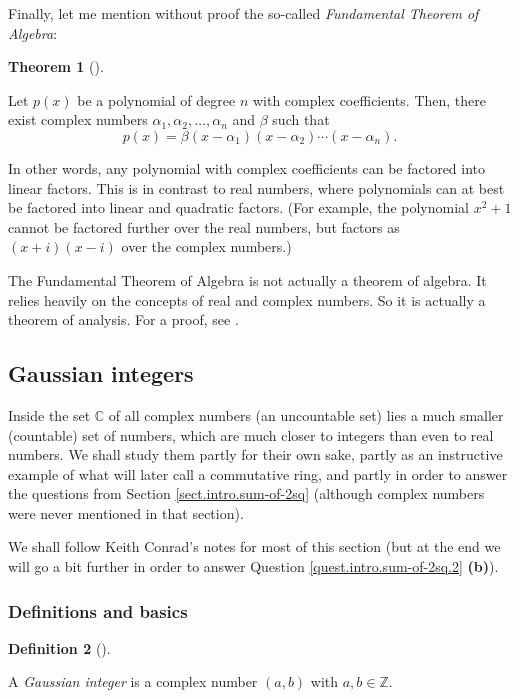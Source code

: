 \documentclass[numbers=enddot,12pt,final,onecolumn,notitlepage]{scrartcl}%
\numberwithin{exer}{subsection}
\theoremstyle{definition}
\newtheorem{theo}{Theorem}[subsection]
\newenvironment{theorem}[1][]
{\begin{theo}[#1]\begin{leftbar}}
{\end{leftbar}\end{theo}}
\newtheorem{defi}[theo]{Definition}
\newenvironment{definition}[1][]
{\begin{defi}[#1]\begin{leftbar}}
{\end{leftbar}\end{defi}}
\begin{document}
Finally, let me mention without proof the so-called \textit{Fundamental
Theorem of Algebra}:

\begin{theorem}
\label{thm.CC.FTA.factor}Let $p\left(  x\right)  $ be a polynomial of degree
$n$ with complex coefficients. Then, there exist complex numbers $\alpha
_{1},\alpha_{2},\ldots,\alpha_{n}$ and $\beta$ such that%
\[
p\left(  x\right)  =\beta\left(  x-\alpha_{1}\right)  \left(  x-\alpha
_{2}\right)  \cdots\left(  x-\alpha_{n}\right)  .
\]

\end{theorem}

In other words, any polynomial with complex coefficients can be factored into
linear factors. This is in contrast to real numbers, where polynomials can at
best be factored into linear and quadratic factors. (For example, the
polynomial $x^{2}+1$ cannot be factored further over the real numbers, but
factors as $\left(  x+i\right)  \left(  x-i\right)  $ over the complex numbers.)

The Fundamental Theorem of Algebra is not actually a theorem of algebra. It
relies heavily on the concepts of real and complex numbers. So it is actually
a theorem of analysis. For a proof, see \cite[Theorem 3.2.2]{LaNaSc16}.

\subsection{Gaussian integers}

Inside the set $\mathbb{C}$ of all complex numbers (an uncountable set) lies a
much smaller (countable) set of numbers, which are much closer to integers
than even to real numbers. We shall study them partly for their own sake,
partly as an instructive example of what will later call a commutative ring,
and partly in order to answer the questions from Section
\ref{sect.intro.sum-of-2sq} (although complex numbers were never mentioned in
that section).

We shall follow Keith Conrad's notes \cite{Conrad-Gauss} for most of this
section (but at the end we will go a bit further in order to answer Question
\ref{quest.intro.sum-of-2sq.2} \textbf{(b)}).

\subsubsection{Definitions and basics}

\begin{definition}
\label{def.Z[i].gauss.gauss}A \textit{Gaussian integer} is a complex number
$\left(  a,b\right)  $ with $a,b\in\mathbb{Z}$.
\end{definition}
\end{document}
